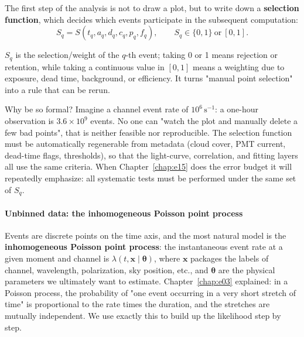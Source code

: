 The first step of the analysis is not to draw a plot, but to write down a \textbf{selection function}, which decides which events participate in the subsequent computation:
\begin{equation}
  S_q = S(t_q,a_q,d_q,c_q,p_q,f_q),
  \qquad
  S_q\in\{0,1\}\ \text{or}\ [0,1] .
  \label{eq:e14-selection}
\end{equation}
\begin{formulaexplain}
$S_q$ is the selection/weight of the $q$-th event; taking 0 or 1 means rejection or retention, while taking a continuous value in $[0,1]$ means a weighting due to exposure, dead time, background, or efficiency. It turns "manual point selection" into a rule that can be rerun.
\end{formulaexplain}
Why be so formal? Imagine a channel event rate of $10^{6}\,\mathrm{s^{-1}}$: a one-hour observation is $3.6\times10^{9}$ events. No one can "watch the plot and manually delete a few bad points", that is neither feasible nor reproducible. The selection function must be automatically regenerable from metadata (cloud cover, PMT current, dead-time flags, thresholds), so that the light-curve, correlation, and fitting layers all use the same criteria. When Chapter~\ref{chap:e15} does the error budget it will repeatedly emphasize: all systematic tests must be performed under the same set of $S_q$.

\paragraph{Unbinned data: the inhomogeneous Poisson point process}

Events are discrete points on the time axis, and the most natural model is the \textbf{inhomogeneous Poisson point process}: the instantaneous event rate at a given moment and channel is $\lambda(t,\bm{x}\mid\bm{\theta})$, where $\bm x$ packages the labels of channel, wavelength, polarization, sky position, etc., and $\bm\theta$ are the physical parameters we ultimately want to estimate. Chapter~\ref{chap:e03} explained: in a Poisson process, the probability of "one event occurring in a very short stretch of time" is proportional to the rate times the duration, and the stretches are mutually independent. We use exactly this to build up the likelihood step by step.

